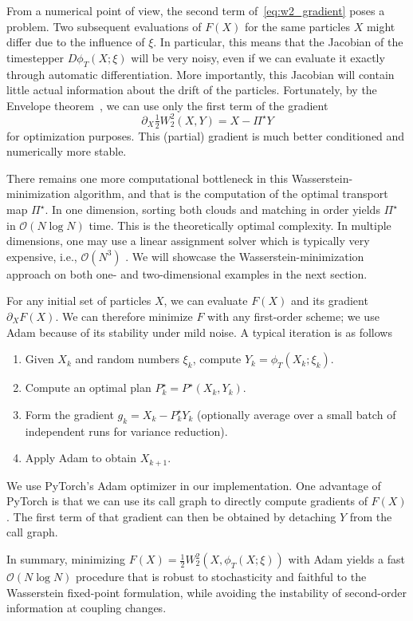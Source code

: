 \documentclass{article}
\begin{document}
From a numerical point of view, the second term of~\eqref{eq:w2_gradient} poses a problem. Two subsequent evaluations of $F(X)$ for the same particles $X$ might differ due to the influence of $\xi$. In particular, this means that the Jacobian of the timestepper $D\phi_T(X; \xi)$ will be very noisy, even if we can evaluate it exactly through automatic differentiation. More importantly, this Jacobian will contain little actual information about the drift of the particles. Fortunately, by the Envelope theorem~\cite{}, we can use only the first term of the gradient
\begin{equation}
\partial_X \tfrac{1}{2}W_2^2(X,Y) = X - \Pi^\star Y
\end{equation}
for optimization purposes. This (partial) gradient is much better conditioned and numerically more stable.

There remains one more computational bottleneck in this Wasserstein-minimization algorithm, and that is the computation of the optimal transport map $\Pi^\star$. In one dimension, sorting both clouds and matching in order yields $\Pi^\star$ in $\mathcal{O}(N\log N)$ time. This is the theoretically optimal complexity. In multiple dimensions, one may use a linear assignment solver which is typically very expensive, i.e., $\mathcal{O}(N^3)$ . We will showcase the Wasserstein-minimization approach on both one- and two-dimensional examples in the next section.

For any initial set of particles $X$, we can evaluate $F(X)$ and its gradient $\partial_X F(X)$. We can therefore minimize $F$ with any first-order scheme; we use Adam because of its stability under mild noise. A typical iteration is as follows
\begin{enumerate}
\item Given $X_k$ and random numbers $\xi_k$, compute $Y_k=\phi_T(X_k;\xi_k)$.
\item Compute an optimal plan $P_k^\star=P^\star(X_k,Y_k)$.
\item Form the gradient $g_k=X_k-P_k^\star Y_k$ (optionally average over a small batch of independent runs for variance reduction).
\item Apply Adam to obtain $X_{k+1}$.
\end{enumerate}
We use PyTorch's Adam optimizer in our implementation. One advantage of PyTorch is that we can use its call graph to directly compute gradients of $F(X)$. The first term of that gradient can then be obtained by detaching $Y$ from the call graph.

In summary, minimizing $F(X)=\tfrac12 W_2^2(X,\phi_T(X;\xi))$ with Adam yields a fast $\mathcal{O}(N \log N)$ procedure that is robust to stochasticity and faithful to the Wasserstein fixed-point formulation, while avoiding the instability of second-order information at coupling changes.
\end{document}
